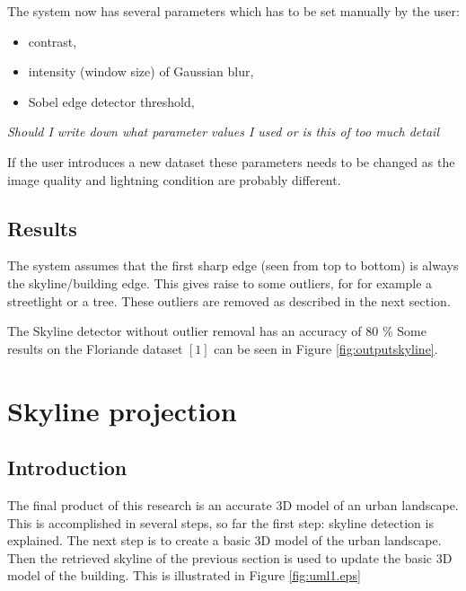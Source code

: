 \documentclass[10pt]{article}
\begin{document}
The system now has several parameters which has to be set manually by the user:
\begin{itemize}
	\item contrast,
	\item intensity (window size) of Gaussian blur,
	\item Sobel edge detector threshold,
\end{itemize}
\textit{Should I write down what parameter values I used or is this of too much
detail}

If the user introduces a new dataset these parameters needs to be changed
as the image quality and lightning condition are probably different.

 \subsection{Results}%
The system assumes that the first sharp edge (seen from top to bottom) is
always the skyline/building edge. This gives raise to some outliers, for 
for example a streetlight or a tree. These outliers are removed as described in
the next section.  

The Skyline detector without outlier removal has an accuracy of 80 \% 
Some results on the Floriande dataset $[1]$ can be seen in Figure \ref{fig:outputskyline}.



\section{Skyline projection}
 \subsection{Introduction}
The final product of this research is an accurate 3D model of an urban
landscape. This is accomplished in several steps, so far the first step: skyline detection is
explained. The next step is to create a basic 3D model of the urban landscape.
Then the retrieved skyline of the previous section is used to update the basic
3D model of the building. This is illustrated in Figure \ref{fig:uml1.eps}
\end{document}
